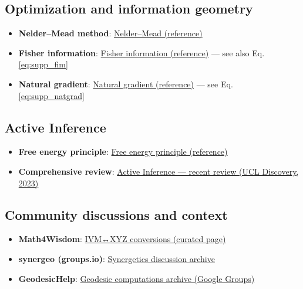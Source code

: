 \documentclass[
]{article}
\providecommand{\tightlist}{%
  \setlength{\itemsep}{0pt}\setlength{\parskip}{0pt}}
\begin{document}
\hypertarget{optimization-and-information-geometry}{%
\subsection{Optimization and information
geometry}\label{optimization-and-information-geometry}}

\begin{itemize}
\tightlist
\item
  \textbf{Nelder--Mead method}:
  \href{https://en.wikipedia.org/wiki/Nelder\%E2\%80\%93Mead_method}{Nelder--Mead
  (reference)}
\item
  \textbf{Fisher information}:
  \href{https://en.wikipedia.org/wiki/Fisher_information}{Fisher
  information (reference)} --- see also Eq. \eqref{eq:supp_fim}
\item
  \textbf{Natural gradient}:
  \href{https://en.wikipedia.org/wiki/Natural_gradient}{Natural gradient
  (reference)} --- see Eq. \eqref{eq:supp_natgrad}
\end{itemize}

\hypertarget{active-inference}{%
\subsection{Active Inference}\label{active-inference}}

\begin{itemize}
\tightlist
\item
  \textbf{Free energy principle}:
  \href{https://en.wikipedia.org/wiki/Free_energy_principle}{Free energy
  principle (reference)}
\item
  \textbf{Comprehensive review}:
  \href{https://discovery.ucl.ac.uk/id/eprint/10176959/1/1-s2.0-S1571064523001094-main.pdf}{Active
  Inference --- recent review (UCL Discovery, 2023)}
\end{itemize}

\hypertarget{community-discussions-and-context}{%
\subsection{Community discussions and
context}\label{community-discussions-and-context}}

\begin{itemize}
\tightlist
\item
  \textbf{Math4Wisdom}:
  \href{https://coda.io/@daniel-ari-friedman/math4wisdom/ivm-xyz-40}{IVM↔XYZ
  conversions (curated page)}
\item
  \textbf{synergeo (groups.io)}:
  \href{https://groups.io/g/synergeo/topics}{Synergetics discussion
  archive}
\item
  \textbf{GeodesicHelp}:
  \href{https://groups.google.com/g/GeodesicHelp/}{Geodesic computations
  archive (Google Groups)}
\end{itemize}
\end{document}
